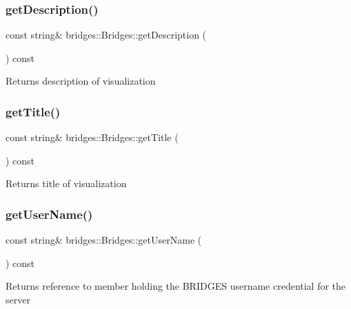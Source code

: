 \subsubsection{\texorpdfstring{get\+Description()}{getDescription()}}
{\footnotesize\ttfamily const string\& bridges\+::\+Bridges\+::get\+Description (\begin{DoxyParamCaption}{ }\end{DoxyParamCaption}) const\hspace{0.3cm}{\ttfamily [inline]}}

\begin{DoxyReturn}{Returns}
description of visualization 
\end{DoxyReturn}
\mbox{\label{classbridges_1_1_bridges_a8fe8c79b0f852c0049a699c801e40a61}} 
\subsubsection{\texorpdfstring{get\+Title()}{getTitle()}}
{\footnotesize\ttfamily const string\& bridges\+::\+Bridges\+::get\+Title (\begin{DoxyParamCaption}{ }\end{DoxyParamCaption}) const\hspace{0.3cm}{\ttfamily [inline]}}

\begin{DoxyReturn}{Returns}
title of visualization 
\end{DoxyReturn}
\mbox{\label{classbridges_1_1_bridges_ad16be2d94936fd555bc05f58c8c21f50}} 
\subsubsection{\texorpdfstring{get\+User\+Name()}{getUserName()}}
{\footnotesize\ttfamily const string\& bridges\+::\+Bridges\+::get\+User\+Name (\begin{DoxyParamCaption}{ }\end{DoxyParamCaption}) const\hspace{0.3cm}{\ttfamily [inline]}}

\begin{DoxyReturn}{Returns}
reference to member holding the B\+R\+I\+D\+G\+ES username credential for the server 
\end{DoxyReturn}
\mbox{\label{classbridges_1_1_bridges_a6c2897b19a25989e09c031152a74317d}} 
